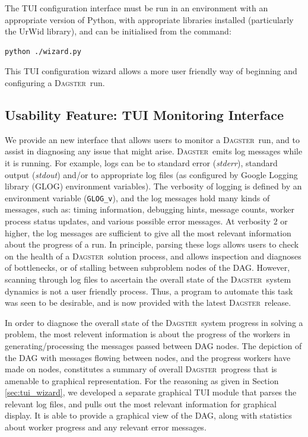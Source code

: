 \documentclass[10pt,a4paper,oneside,headinclude,footinclude,BCOR5mm]{scrartcl}
\newcommand{\dagster}{\textsc{Dagster}\xspace}
\begin{document}
The TUI configuration interface must be run in an environment with an appropriate version of Python, with appropriate libraries installed (particularly the UrWid library), and can be initialised from the command:

\begin{Verbatim}[frame=single]
python ./wizard.py
\end{Verbatim}

This TUI configuration wizard allows a more user friendly way of beginning and configuring a \dagster\ run.

\subsection{Usability Feature: TUI Monitoring Interface}\label{sec:tui_monitoring}

We provide an new interface that allows users to monitor a \dagster\ run, and to assist in diagnosing any issue that might arise.
\dagster\ emits log messages while it is running.
For example, logs can be to standard error (\textit{stderr}), standard output (\textit{stdout}) and/or to appropriate log files (as configured by Google Logging library (GLOG) environment variables).
The verbosity of logging is defined by an environment variable (\texttt{GLOG\_v}), and the log messages hold many kinds of messages, such as: timing information, debugging hints, message counts, worker process status updates, and various possible error messages.
At verbosity $2$ or higher, the log messages are sufficient to give all the most relevant information about the progress of a run.
In principle, parsing these logs allows users to check on the health of a \dagster\ solution process, and allows inspection and diagnoses of bottlenecks, or of stalling between subproblem nodes of the DAG.
However, scanning through log files to ascertain the overall state of the \dagster\ system dynamics is not a user friendly process.
Thus, a program to automate this task was seen to be desirable, and is now provided with the latest \dagster\ release.

In order to diagnose the overall state of the \dagster\ system progress in solving a problem, the most relevent information is about the progress of the workers in generating/processing the messages passed between DAG nodes.
The depiction of the DAG with messages flowing between nodes, and the progress workers have made on nodes, constitutes a summary of overall \dagster\ progress that is amenable to graphical representation.
For the reasoning as given in Section \ref{sec:tui_wizard}, we developed a separate graphical TUI module that parses the relevant log files, and pulls out the most relevant information for graphical display.
It is able to provide a graphical view of the DAG, along with statistics about worker progress and any relevant error messages.
\end{document}
